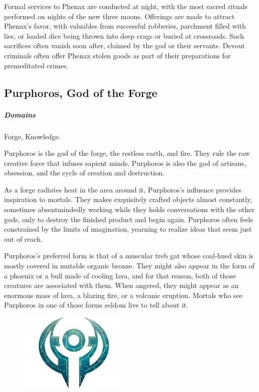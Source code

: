         Formal services to Phenax are conducted at night, with the most sacred rituals performed on nights of the new three moons.
        Offerings are made to attract Phenax's favor, with valuables from successful robberies, parchment filled with lies, or loaded dice being thrown into deep crags or buried at crossroads.
        Such sacrifices often vanish soon after, claimed by the god or their servants.
        Devout criminals often offer Phenax stolen goods as part of their preparations for premeditated crimes.


\subsection*{Purphoros, God of the Forge} \label{ssec::purphoros}
    \subparagraph{Domains} Forge, Knowledge.

    Purphoros is the god of the forge, the restless earth, and fire.
    They rule the raw creative force that infuses sapient minds.
    Purphoros is also the god of artisans, obsession, and the cycle of creation and destruction.

    As a forge radiates heat in the area around it, Purphoros's influence provides inspiration to mortals.
    They makes exquisitely crafted objects almost constantly, sometimes absentmindedly working while they holds conversations with the other gods, only to destroy the finished product and begin again.
    Purphoros often feels constrained by the limits of imagination, yearning to realize ideas that seem just out of reach.

    Purphoros's preferred form is that of a muscular treb gat whose coal-hued skin is mostly covered in mutable organic bronze.
    They might also appear in the form of a phoenix or a bull made of cooling lava, and for that reason, both of those creatures are associated with them.
    When angered, they might appear as an enormous mass of lava, a blazing fire, or a volcanic eruption.
    Mortals who see Purphoros in one of those forms seldom live to tell about it.

    \begin{figure}[b]
        \centering
        \includegraphics[width=0.47\textwidth]{02viphoger/img/10s_purphoros.png}
    \end{figure}

